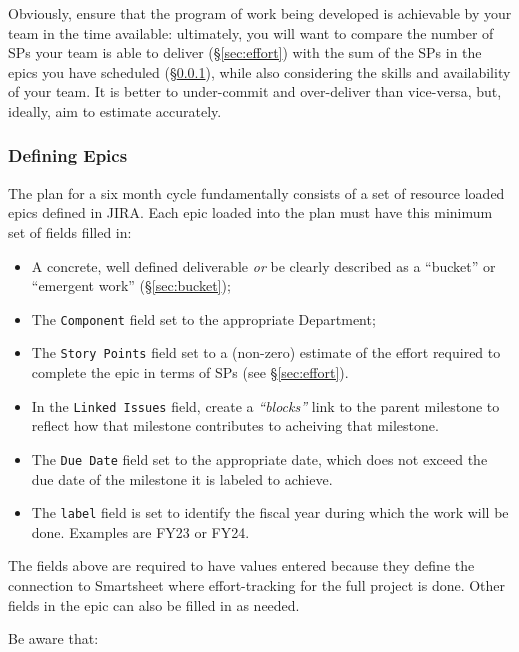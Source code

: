 \begin{itemize}
Obviously, ensure that the program of work being developed is achievable by your team in the time available: ultimately, you will want to compare the number of \glspl{SP} your team is able to deliver (\S\ref{sec:effort}) with the sum of the \glspl{SP} in the \glspl{epic} you have scheduled (\S\ref{sec:planning-epics}), while also considering the skills and availability of your team.
It is better to under-commit and over-deliver than vice-versa, but, ideally, aim to estimate accurately.

\subsubsection{Defining Epics} \label{sec:planning-epics}

The plan for a six month \gls{cycle} fundamentally consists of a set of resource loaded \glspl{epic} defined in \gls{JIRA}.
Each \gls{epic} loaded into the plan must have this minimum set of fields filled in:

\begin{itemize}
\item A concrete, well defined deliverable \emph{or} be clearly described as a ``bucket'' or ``emergent work'' (\S\ref{sec:bucket});
\item The \texttt{Component} field set to the appropriate Department;
\item The \texttt{Story Points} field set to a (non-zero) estimate of the effort required to complete the \gls{epic} in terms of \glspl{SP} (see \S\ref{sec:effort}).
\item In the \texttt{Linked Issues} field, create a \textit{``blocks''} link to the parent milestone to reflect how that milestone contributes to acheiving that milestone.
\item The \texttt{Due Date} field set to the appropriate date, which does not exceed the due date of the milestone it is labeled to achieve.
\item The \texttt{label} field is set to identify the fiscal year during which the work will be done. Examples are FY23 or FY24.

\end{itemize}
The fields above are required to have values entered because they define the connection to Smartsheet where effort-tracking for the full project is done. Other fields in the epic can also be filled in as needed.

Be aware that:


\end{itemize}
